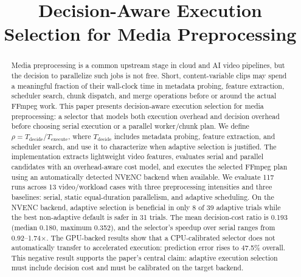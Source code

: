\documentclass[conference]{IEEEtran}
\newcommand{\MeanRho}{0.193}
\newcommand{\MedianRho}{0.180}
\newcommand{\MaxRho}{0.352}
\newcommand{\BeneficialCount}{8}
\newcommand{\DefaultSaferCount}{31}
\newcommand{\RunCount}{117}
\newcommand{\CaseCount}{13}
\newcommand{\SpeedupRange}{0.92--1.74$\times$}
\newcommand{\PredictionMAE}{47.5\%}
\begin{document}
\title{Decision-Aware Execution Selection for Media Preprocessing}

\author{
\and
{}
\and
{}
}

\maketitle

\begin{abstract}
Media preprocessing is a common upstream stage in cloud and AI video pipelines, but the decision to parallelize such jobs is not free.
Short, content-variable clips may spend a meaningful fraction of their wall-clock time in metadata probing, feature extraction, scheduler search, chunk dispatch, and merge operations before or around the actual FFmpeg work.
This paper presents decision-aware execution selection for media preprocessing: a selector that models both execution overhead and decision overhead before choosing serial execution or a parallel worker/chunk plan.
We define $\rho = T_{\mathrm{decide}} / T_{\mathrm{execute}}$, where $T_{\mathrm{decide}}$ includes metadata probing, feature extraction, and scheduler search, and use it to characterize when adaptive selection is justified.
The implementation extracts lightweight video features, evaluates serial and parallel candidates with an overhead-aware cost model, and executes the selected FFmpeg plan using an automatically detected NVENC backend when available.
We evaluate \RunCount{} runs across \CaseCount{} video/workload cases with three preprocessing intensities and three baselines: serial, static equal-duration parallelism, and adaptive scheduling.
On the NVENC backend, adaptive selection is beneficial in only \BeneficialCount{} of 39 adaptive trials while the best non-adaptive default is safer in \DefaultSaferCount{} trials.
The mean decision-cost ratio is \MeanRho{} (median \MedianRho{}, maximum \MaxRho{}), and the selector's speedup over serial ranges from \SpeedupRange{}.
The GPU-backed results show that a CPU-calibrated selector does not automatically transfer to accelerated execution: prediction error rises to \PredictionMAE{} overall.
This negative result supports the paper's central claim: adaptive execution selection must include decision cost and must be calibrated on the target backend.
\end{abstract}
\end{document}

